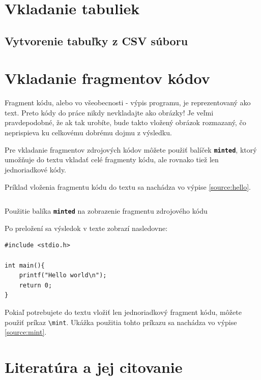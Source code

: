 \section{Vkladanie tabuliek}

\subsection{Vytvorenie tabuľky z CSV súboru}

\section{Vkladanie fragmentov kódov}

Fragment kódu, alebo vo všeobecnosti - výpis programu, je reprezentovaný ako text. Preto kódy do práce nikdy nevkladajte ako obrázky! Je veľmi pravdepodobné, že ak tak urobíte, bude takto vložený obrázok rozmazaný, čo neprispieva ku celkovému dobrému dojmu z výsledku.

Pre vkladanie fragmentov zdrojových kódov môžete použiť balíček {\bf\tt minted}, ktorý umožňuje do textu vkladať celé fragmenty kódu, ale rovnako tiež len jednoriadkové kódy. 

Príklad vloženia fragmentu kódu do textu sa nachádza vo výpise \ref{source:hello}.


\begin{listing}[ht]
\inputminted[frame=lines]{latex}{examples/hello.world.tex}
\caption{Použitie balíka {\tt\bf minted} na zobrazenie fragmentu zdrojového kódu}\label{source:hello}
\end{listing}

Po preložení sa výsledok v texte zobrazí nasledovne:

\begin{verbatim}
#include <stdio.h>

int main(){
    printf("Hello world\n");
    return 0;
}
\end{verbatim}

Pokiaľ potrebujete do textu vložiť len jednoriadkový fragment kódu, môžete použiť príkaz {\tt\textbackslash{mint}}. Ukážka použitia tohto príkazu sa nachádza vo výpise \ref{source:mint}.


\section{Literatúra a jej citovanie}

